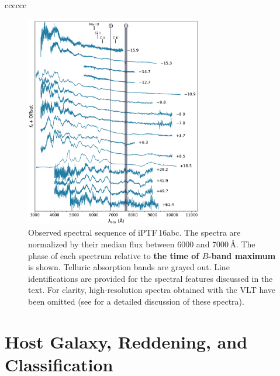 \documentclass[twocolumn]{aastex61}
\newcommand{\abc}{iPTF\,16abc}
\begin{document}
\begin{deluxetable}{cccccc}
  \enddata
\end{deluxetable}

\begin{figure}[!htb]
  \centering
  \includegraphics[width=0.69\textwidth]{spectra.pdf}
  \caption{
  Observed spectral sequence of \abc. The spectra are normalized by their
  median flux between 6000 and 7000$\,\textrm{\AA}$. The phase of each
  spectrum relative to \textbf{the time of $B$-band maximum} is shown.
  Telluric absorption bands are grayed out. Line identifications are provided
  for the spectral features discussed in the text. For clarity,
  high-resolution spectra obtained with the VLT have been omitted (see
  \citealt{2017A&A...606A.111F} for a detailed discussion of these spectra).}
  \label{fig:spec_seq}
\end{figure}

\section{Host Galaxy, Reddening, and Classification}
\label{sec:usual_staff}
\end{document}
